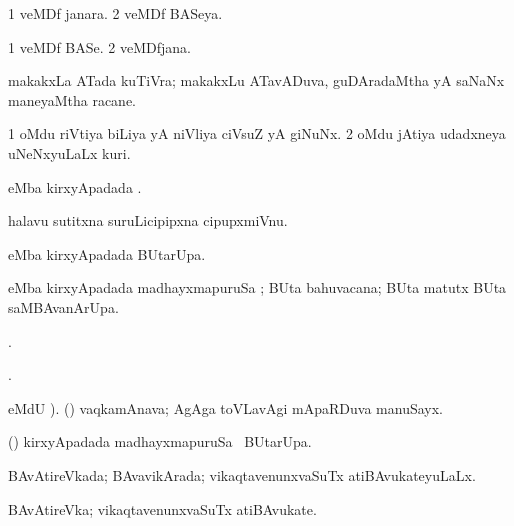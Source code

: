 \bentry
{} 
\gl{\gu}
\expl{}
\bmng
\bnum
\num{1} veMDf janara. 
\num{2} veMDf BASeya. 
\enum
\emng
\eentry

\bentry
{} 
\gl{\nA}
\expl{}
\bmng
\bnum
\num{1} veMDf BASe. 
\num{2} veMDfjana. 
\enum
\emng
\eentry

\bentry
{} 
\gl{\nA}
\expl{}
\bmng
makakxLa ATada kuTiVra; makakxLu ATavADuva, guDAradaMtha yA saNaNx maneyaMtha racane. 
\emng
\eentry

\bentry
{} 
\gl{\nA}
\expl{}
\bmng
\bnum
\num{1} oMdu riVtiya biLiya yA niVliya ciVsuZ yA giNuNx. 
\num{2} oMdu jAtiya udadxneya uNeNxyuLaLx kuri. 
\enum
\emng
\eentry

\bentry
{} 
\gl{\kirx}
\expl{}
\bmng
{} eMba kirxyApadada \BU. 
\emng
\eentry

\bentry
{} 
\gl{\nA}
\expl{}
\bmng
halavu sutitxna suruLicipipxna cipupxmiVnu. 
\emng
\eentry

\bentry
{} 
\gl{\kirx}
\expl{}
\bmng
{} eMba kirxyApadada BUtarUpa. 
\emng
\eentry

\bentry
{} 
\gl{\kirx}
\expl{}
\bmng
{} eMba kirxyApadada madhayxmapuruSa \Eva; BUta bahuvacana; BUta matutx BUta saMBAvanArUpa. 
\emng
\eentry

\bentry
{} 
\bmng
{}. 
\emng
\eentry

\bentry
{} 
\expl{}
\bmng
{}. 
\emng
\eentry

\bentry
{} 
\gl{\nA}
\bmng
{} eMdU \parx). (\pu) vaqkamAnava; AgAga toVLavAgi mApaRDuva manuSayx. 
\emng
\eentry

\bentry
{} 
\gl{\kirx}
\expl{}
\bmng
(\pArxparx)  kirxyApadada madhayxmapuruSa \Eva\ BUtarUpa. 
\emng
\eentry

\bentry
{} 
\gl{\gu}
\expl{}
\bmng
BAvAtireVkada; BAvavikArada; vikaqtavenunxvaSuTx atiBAvukateyuLaLx. 
\emng
\eentry

\bentry
{} 
\gl{\nA}
\expl{}
\bmng
BAvAtireVka; vikaqtavenunxvaSuTx atiBAvukate. 
\emng
\eentry

